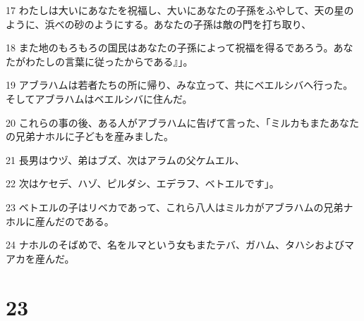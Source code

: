 \par 17 わたしは大いにあなたを祝福し、大いにあなたの子孫をふやして、天の星のように、浜べの砂のようにする。あなたの子孫は敵の門を打ち取り、
\par 18 また地のもろもろの国民はあなたの子孫によって祝福を得るであろう。あなたがわたしの言葉に従ったからである』」。
\par 19 アブラハムは若者たちの所に帰り、みな立って、共にベエルシバへ行った。そしてアブラハムはベエルシバに住んだ。
\par 20 これらの事の後、ある人がアブラハムに告げて言った、「ミルカもまたあなたの兄弟ナホルに子どもを産みました。
\par 21 長男はウヅ、弟はブズ、次はアラムの父ケムエル、
\par 22 次はケセデ、ハゾ、ピルダシ、エデラフ、ベトエルです」。
\par 23 ベトエルの子はリベカであって、これら八人はミルカがアブラハムの兄弟ナホルに産んだのである。
\par 24 ナホルのそばめで、名をルマという女もまたテバ、ガハム、タハシおよびマアカを産んだ。

\chapter{23}

